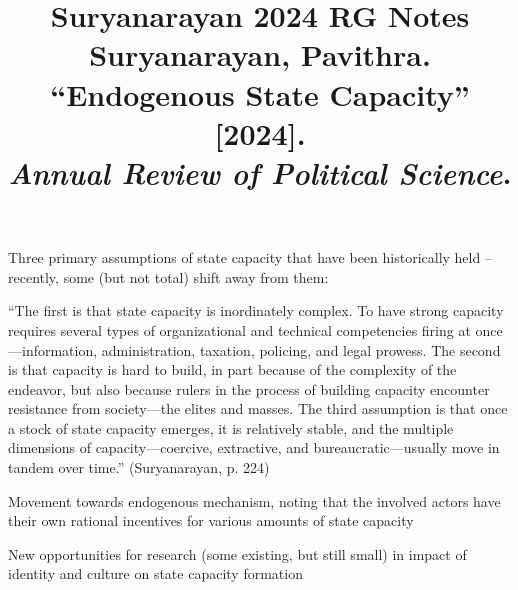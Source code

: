 \documentclass[12pt]{article}
\title{\textbf{Suryanarayan 2024 RG Notes}\\
\large Suryanarayan, Pavithra. ``Endogenous State Capacity'' [2024].\\
\textit{Annual Review of Political Science}.}
\author{}
\date{}
\begin{document}
\maketitle

Three primary assumptions of state capacity that have been historically held -- recently, some (but not total) shift away from them:

``The first is that state capacity is inordinately complex. To have strong capacity requires several types of organizational and technical competencies firing at once---information, administration, taxation, policing, and legal prowess. The second is that capacity is hard to build, in part because of the complexity of the endeavor, but also because rulers in the process of building capacity encounter resistance from society---the elites and masses. The third assumption is that once a stock of state capacity emerges, it is relatively stable, and the multiple dimensions of capacity---coercive, extractive, and bureaucratic---usually move in tandem over time.'' (Suryanarayan, p. 224)

Movement towards endogenous mechanism, noting that the involved actors have their own rational incentives for various amounts of state capacity

New opportunities for research (some existing, but still small) in impact of identity and culture on state capacity formation
\end{document}
